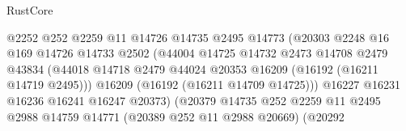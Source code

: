 \begin{lexlean}{RustCore}
\begin{coremodule}
                                            @2252
                                            @252
                                            @2259
                                            @11
                                            @14726
                                            @14735
                                            @2495
                                            @14773
                                            (@20303
                                              @2248
                                              @16
                                              @169
                                              @14726
                                              @14733
                                              @2502
                                              (@44004
                                                @14725
                                                @14732
                                                @2473
                                                @14708
                                                @2479
                                                @43834
                                                (@44018
                                                  @14718
                                                  @2479
                                                  @44024
                                                  @20353
                                                  @16209
                                                  (@16192 (@16211 @14719 @2495)))
                                                @16209
                                                (@16192 (@16211 @14709 @14725)))
                                              @16227
                                              @16231
                                              @16236
                                              @16241
                                              @16247
                                              @20373)
                                            (@20379
                                              @14735
                                              @252
                                              @2259
                                              @11
                                              @2495
                                              @2988
                                              @14759
                                              @14771
                                              (@20389 @252 @11 @2988 @20669)
                                              (@20292

\end{coremodule}
\end{lexlean}
